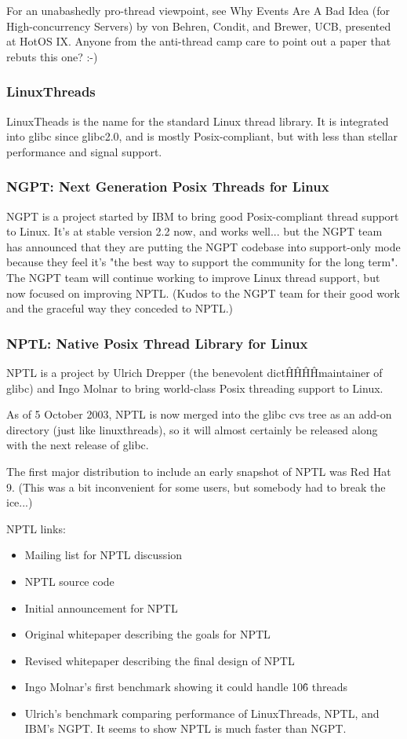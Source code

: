 \documentclass[twoside, xetex]{report}
\begin{document}
For an unabashedly pro-thread viewpoint, see Why Events Are A Bad Idea (for High-concurrency Servers) by von Behren, Condit, and Brewer, UCB, presented at HotOS IX. Anyone from the anti-thread camp care to point out a paper that rebuts this one? :-)

\subsubsection*{LinuxThreads}

LinuxTheads is the name for the standard Linux thread library. It is integrated into glibc since glibc2.0, and is mostly Posix-compliant, but with less than stellar performance and signal support.

\subsubsection*{NGPT: Next Generation Posix Threads for Linux}

NGPT is a project started by IBM to bring good Posix-compliant thread support to Linux. It's at stable version 2.2 now, and works well... but the NGPT team has announced that they are putting the NGPT codebase into support-only mode because they feel it's "the best way to support the community for the long term". The NGPT team will continue working to improve Linux thread support, but now focused on improving NPTL. (Kudos to the NGPT team for their good work and the graceful way they conceded to NPTL.)

\subsubsection*{NPTL: Native Posix Thread Library for Linux}

NPTL is a project by Ulrich Drepper (the benevolent dict\^H\^H\^H\^Hmaintainer of glibc) and Ingo Molnar to bring world-class Posix threading support to Linux.

As of 5 October 2003, NPTL is now merged into the glibc cvs tree as an add-on directory (just like linuxthreads), so it will almost certainly be released along with the next release of glibc.

The first major distribution to include an early snapshot of NPTL was Red Hat 9. (This was a bit inconvenient for some users, but somebody had to break the ice...)

NPTL links:

\begin{itemize}
\item Mailing list for NPTL discussion
\item NPTL source code
\item Initial announcement for NPTL
\item Original whitepaper describing the goals for NPTL
\item Revised whitepaper describing the final design of NPTL
\item Ingo Molnar's first benchmark showing it could handle 10\^6 threads
\item Ulrich's benchmark comparing performance of LinuxThreads, NPTL, and IBM's NGPT. It seems to show NPTL is much faster than NGPT.
\end{itemize}
\end{document}
